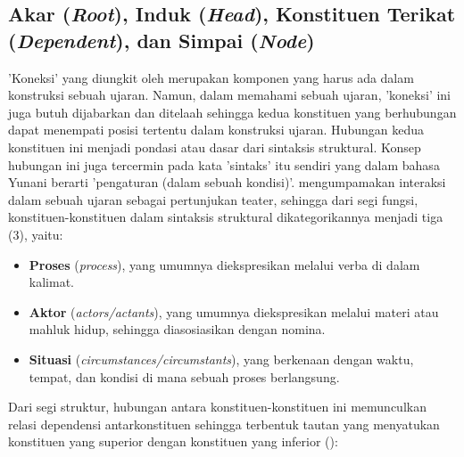 \subsection{Akar (\textit{Root}), Induk (\textit{Head}), Konstituen Terikat (\textit{Dependent}), dan Simpai (\textit{Node})}
'Koneksi' yang diungkit oleh \cite{tesniere1959elements} merupakan komponen yang harus ada dalam konstruksi sebuah ujaran. Namun, dalam memahami sebuah ujaran, 'koneksi' ini juga butuh dijabarkan dan ditelaah sehingga kedua konstituen yang berhubungan dapat menempati posisi tertentu dalam konstruksi ujaran. Hubungan kedua konstituen ini menjadi pondasi atau dasar dari sintaksis struktural. Konsep hubungan ini juga tercermin pada kata 'sintaks' itu sendiri yang dalam bahasa Yunani berarti 'pengaturan (dalam sebuah kondisi)'. \cite{tesniere1959elements} mengumpamakan interaksi dalam sebuah ujaran sebagai pertunjukan teater, sehingga dari segi fungsi, konstituen-konstituen dalam sintaksis struktural dikategorikannya menjadi tiga (3), yaitu:
\begin{itemize}
\item \textbf{Proses} (\textit{process}), yang umumnya diekspresikan melalui verba di dalam kalimat.
\item \textbf{Aktor} (\textit{actors/actants}), yang umumnya diekspresikan melalui materi atau mahluk hidup, sehingga diasosiasikan dengan nomina.
\item \textbf{Situasi} (\textit{circumstances/circumstants}), yang berkenaan dengan waktu, tempat, dan kondisi di mana sebuah proses berlangsung.
\end{itemize}
Dari segi struktur, hubungan antara konstituen-konstituen ini memunculkan relasi dependensi antarkonstituen sehingga terbentuk tautan yang menyatukan konstituen yang superior dengan konstituen yang inferior (\citealp{tesniere1959elements, hudson2010introduction, heringer1993dependency}): 
